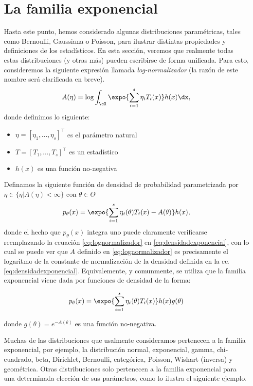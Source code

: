 \section{La familia exponencial}

Hasta este punto, hemos considerado algunas distribuciones paramétricas, tales como Bernoulli, Gaussiana o Poisson, para ilustrar distintas propiedades y definiciones de los estadísticos. En esta sección, veremos que realmente todas estas distribuciones (y otras más) pueden escribirse de forma unificada. Para esto, consideremos la siguiente expresión llamada \textit{log-normalizador} (la razón de este nombre será clarificada en breve).
\begin{equation}
	\label{eq:lognormalizador}
	A(\eta) = \log\int_\cX \expo{\sum_{i=1}^s\eta_iT_i(x)}h(x)\dx,
\end{equation}
donde definimos lo siguiente:
\begin{itemize}
	\item $\eta = [\eta_1,\ldots,\eta_s]^\top$ es el parámetro natural
	\item $T = [T_1,\ldots,T_s]^\top$ es un estadístico
	\item $h(x)$ es una función no-negativa
\end{itemize}

\begin{definition}
    Definamos la siguiente función de densidad de probabilidad parametrizada por $\eta\in\{\eta | A(\eta)<\infty\}$ con $\theta\in\Theta$
\begin{equation}
	\label{eq:densidadexponencial}
 	p_\theta(x) = \expo{\sum_{i=1}^s\eta_i(\theta)T_i(x)-A(\theta)}h(x),
 \end{equation} 
 donde el hecho que $p_\theta(x)$ integra uno puede claramente verificarse reemplazando la ecuación \eqref{eq:lognormalizador} en \eqref{eq:densidadexponencial}, con lo cual se puede ver que $A$ definido en \eqref{eq:lognormalizador} es precisamente el logaritmo de la constante de normalización de la densidad definida en la ec.~ \eqref{eq:densidadexponencial}. Equivalemente, y comunmente, se utiliza que la familia exponencial viene dada por funciones de densidad de la forma:
 
 \[p_\theta(x) = \expo{\sum_{i=1}^s\eta_i(\theta)T_i(x)}h(x)g(\theta)\]
 
 donde $g(\theta) = e^{-A(\theta)}$ es una función no-negativa.
\end{definition}

 Muchas de las distribuciones que usalmente consideramos pertenecen a la familia exponencial, por ejemplo, la distribución normal, exponencial, gamma, chi-cuadrado, beta, Dirichlet, Bernoulli, categórica, Poisson, Wishart (inversa) y geométrica. Otras distribuciones solo pertenecen a la familia exponencial para una determinada elección de sus parámetros, como lo ilustra el siguiente ejemplo.

